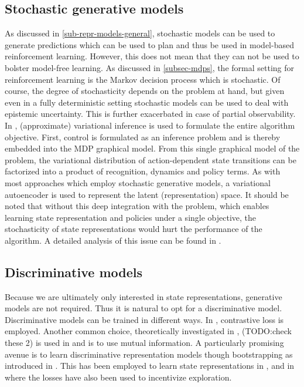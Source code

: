 \subsection{Stochastic generative models}
As discussed in \ref{sub-repr-models-general}, stochastic models can be used to generate 
predictions which can be used to plan and thus be used in model-based reinforcement learning.
However, this does not mean that they can not be used to bolster model-free learning.
As discussed in \ref{subsec-mdps}, the formal setting for reinforcement learning is 
the Markov decision process which is stochastic.
Of course, the degree of stochasticity depends on the problem at hand,
but given even in a fully deterministic setting stochastic models
can be used to deal with epistemic uncertainty.
This is further exacerbated in case of partial observability.
In \cite{slac}, (approximate) variational inference is used to formulate the entire algorithm objective.
First, control is formulated as an inference problem and is thereby embedded into the
MDP graphical model. From this single graphical model of the problem,
the variational distribution of action-dependent state transitions can be factorized
into a product of recognition, dynamics and policy terms.
As with most approaches which employ stochastic generative models, 
a variational autoencoder is used to represent the latent (representation) space.
It should be noted that without this deep integration with the problem,
which enables learning state representation and policies under a single objective,
the stochasticity of state representations would hurt the performance of the algorithm.
A detailed analysis of this issue can be found in \cite{sac+ae}.



\subsection{Discriminative models}
Because we are ultimately only interested in state representations, generative models are not required.
Thus it is natural to opt for a discriminative model.
Discriminative models can be trained in different ways.
In \cite{curl}, contrastive loss is employed.
Another common choice, theoretically investigated in \cite{rakelly2021mutual},
(TODO:check these 2)
is used in \cite{anand2019unsupervised} and \cite{mazoure2020deep} is to use mutual information.
A particularly promising avenue is to learn discriminative representation models
though bootstrapping as introduced in \cite{grill2020bootstrap}.
This has been employed to learn state representations in \cite{schwarzer2020data}, and in \cite{merckling2022exploratory}
where the losses have also been used to incentivize exploration.

